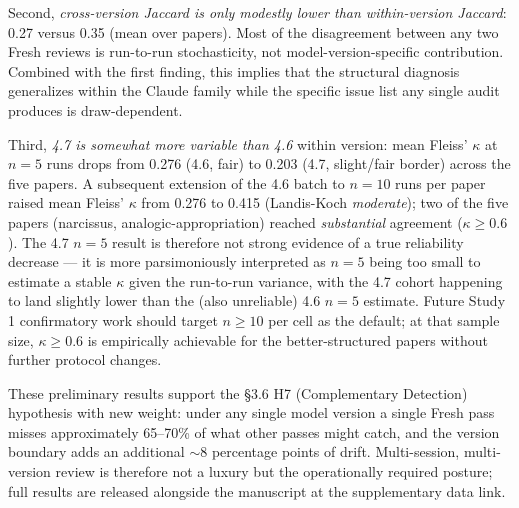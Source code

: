 \documentclass[12pt]{article}
\begin{document}
Second, \emph{cross-version Jaccard is only modestly lower than within-version Jaccard}: 0.27 versus 0.35 (mean over papers). Most of the disagreement between any two Fresh reviews is run-to-run stochasticity, not model-version-specific contribution. Combined with the first finding, this implies that the structural diagnosis generalizes within the Claude family while the specific issue list any single audit produces is draw-dependent.

Third, \emph{4.7 is somewhat more variable than 4.6} within version: mean Fleiss' $\kappa$ at $n=5$ runs drops from 0.276 (4.6, fair) to 0.203 (4.7, slight/fair border) across the five papers. A subsequent extension of the 4.6 batch to $n=10$ runs per paper raised mean Fleiss' $\kappa$ from 0.276 to 0.415 (Landis-Koch \emph{moderate}); two of the five papers (narcissus, analogic-appropriation) reached \emph{substantial} agreement ($\kappa \geq 0.6$). The 4.7 $n=5$ result is therefore not strong evidence of a true reliability decrease — it is more parsimoniously interpreted as $n=5$ being too small to estimate a stable $\kappa$ given the run-to-run variance, with the 4.7 cohort happening to land slightly lower than the (also unreliable) 4.6 $n=5$ estimate. Future Study 1 confirmatory work should target $n \geq 10$ per cell as the default; at that sample size, $\kappa \geq 0.6$ is empirically achievable for the better-structured papers without further protocol changes.

These preliminary results support the §3.6 H7 (Complementary Detection) hypothesis with new weight: under any single model version a single Fresh pass misses approximately 65--70\% of what other passes might catch, and the version boundary adds an additional $\sim$8 percentage points of drift. Multi-session, multi-version review is therefore not a luxury but the operationally required posture; full results are released alongside the manuscript at the supplementary data link.
\end{document}
